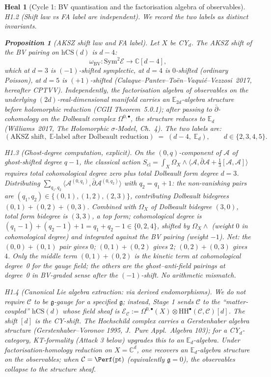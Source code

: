 \documentclass[11pt]{article}
\newtheorem{proposition}[theorem]{Proposition}
\newtheorem*{heal}{Heal}
\theoremstyle{definition}
\providecommand{\CC}{\mathbb{C}}
\providecommand{\HH}{\mathrm{HH}}
\providecommand{\fg}{\mathfrak{g}}
\providecommand{\cA}{\mathcal{A}}
\providecommand{\cE}{\mathcal{E}}
\providecommand{\cC}{\mathcal{C}}
\providecommand{\Sym}{\mathrm{Sym}}
\providecommand{\hCS}{\mathrm{hCS}}
\providecommand{\BV}{\mathrm{BV}}
\begin{document}
\begin{heal}[Cycle 1: BV quantisation and the factorisation algebra of observables]
\emph{H1.2 (Shift law vs FA label are independent).} We record the
two labels as distinct invariants.

\begin{proposition}[AKSZ shift law and FA label]
\label{prop:shift-fa}
Let $X$ be CY$_d$. The AKSZ shift of the BV pairing on $\hCS(d)$ is
$d - 4$:
\[
  \omega_{\BV}\colon \Sym^2 \cE \to \CC[d-4],
\]
which at $d = 3$ is $(-1)$-shifted symplectic, at $d = 4$ is
$0$-shifted (ordinary Poisson), at $d = 5$ is $(+1)$-shifted
(Calaque--Pantev--To\"en--Vaqui\'e--Vezzosi~2017, hereafter CPTVV).
Independently, the factorisation algebra of observables on the
underlying $(2d)$-real-dimensional manifold carries an
$\mathbb{E}_{2d}$-algebra structure \emph{before} holomorphic reduction
(CGII Theorem~5.0.1); after passing to $\bar\partial$-cohomology on
the Dolbeault complex $\Omega^{0,\bullet}$, the structure reduces to
$\mathbb{E}_d$ (Williams~2017, \emph{The Holomorphic $\sigma$-Model},
Ch.~4). The two labels are:
\[
  (\text{AKSZ shift}, \; \mathbb{E}\text{-label after Dolbeault reduction})
  \;=\; (d - 4, \; \mathbb{E}_d), \qquad d\in\{2,3,4,5\}.
\]
\end{proposition}

\emph{H1.3 (Ghost-degree computation, explicit).} On the $(0,q)$-component
of $\cA$ of ghost-shifted degree $q - 1$, the classical action
$S_{\mathrm{cl}} = \int_X \Omega_X \wedge \langle \cA, \bar\partial\cA
+ \tfrac{1}{3}[\cA,\cA]\rangle$ requires total cohomological degree
zero plus total Dolbeault form degree $d = 3$. Distributing
$\sum_{q_1, q_2} \langle\cA^{(0,q_1)}, \bar\partial \cA^{(0,q_2)}\rangle$
with $q_2 = q_1 + 1$: the non-vanishing pairs are
$(q_1, q_2) \in \{(0,1), (1,2), (2,3)\}$, contributing Dolbeault
bidegrees $(0, 1) + (0, 2) + (0, 3)$. Combined with $\Omega_X$ of
Dolbeault bidegree $(3, 0)$, total form bidegree is $(3, 3)$, a top
form; cohomological degree is $(q_1 - 1) + (q_2 - 1) + 1 = q_1 + q_2 - 1
\in\{0, 2, 4\}$, shifted by $\Omega_X\wedge$ (weight $0$ in cohomological
degree) and integrated against the BV pairing (weight $-1$). Net: the
$(0,0)+(0,1)$ pair gives $0$; $(0,1)+(0,2)$ gives $2$; $(0,2)+(0,3)$
gives $4$. Only the middle term $(0,1)+(0,2)$ is the kinetic term at
cohomological degree~0 for the gauge field; the others are the
ghost--anti-field pairings at degree~0 in BV-graded sense after the
$(-1)$-shift. \emph{No arithmetic mismatch.}

\emph{H1.4 (Canonical Lie algebra extraction: via derived
endomorphisms).} We do not require $\cC$ to be $\fg$-gauge for a
specified $\fg$; instead, Stage 1 sends $\cC$ to the ``matter-coupled''
$\hCS(d)$ whose field sheaf is $\cE_{\cC} := \Omega^{0,\bullet}(X)\otimes
\HH^\bullet(\cC,\cC)[d]$. The shift $[d]$ is the CY-shift. The
Hochschild complex carries a Gerstenhaber algebra structure
(Gerstenhaber--Voronov 1995, \emph{J.~Pure Appl.~Algebra} 103); for a
CY$_d$-category, KT-formality (Attack 3 below) upgrades this to an
$\mathbb{E}_d$-algebra. Under factorisation-homology reduction on
$X = \CC^d$, one recovers an $\mathbb{E}_d$-algebra structure on the
observables; when $\cC = \Perf(\text{pt})$ (equivalently $\fg = 0$),
the observables collapse to the structure sheaf.


\end{heal}
\end{document}

